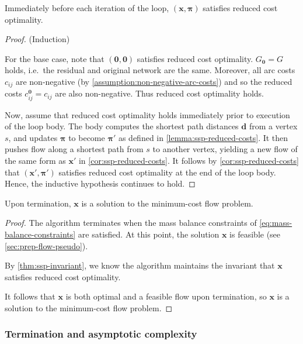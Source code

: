 \begin{thm} \label{thm:ssp-invariant}
Immediately before each iteration of the loop, $(\mathbf{x},\boldsymbol{\pi})$ satisfies reduced cost optimality.
\end{thm}
\begin{proof} (Induction)

For the base case, note that $(\mathbf{0},\mathbf{0})$ satisfies reduced cost optimality. $G_{\boldsymbol{0}} = G$ holds, i.e.\ the residual and original network are the same. Moreover, all arc costs $c_{ij}$ are non-negative (by \cref{assumption:non-negative-arc-costs}) and so the reduced costs $c^{\boldsymbol{0}}_{ij}=c_{ij}$ are also non-negative. Thus reduced cost optimality holds.

Now, assume that reduced cost optimality holds immediately prior to execution of the loop body. The body computes the shortest path distances $\mathbf{d}$ from a vertex $s$, and updates $\boldsymbol{\pi}$ to become $\boldsymbol{\pi'}$ as defined in \cref{lemma:ssp-reduced-costs}. It then pushes flow along a shortest path from $s$ to another vertex, yielding a new flow of the same form as $\mathbf{x'}$ in \cref{cor:ssp-reduced-costs}. It follows by \cref{cor:ssp-reduced-costs} that $(\mathbf{x}',\boldsymbol{\pi}')$ satisfies reduced cost optimality at the end of the loop body. Hence, the inductive hypothesis continues to hold.
\end{proof}

\begin{cor} \label{cor:ssp-correctness}
Upon termination, $\mathbf{x}$ is a solution to the minimum-cost flow problem.
\end{cor}
\begin{proof}
The algorithm terminates when the mass balance constraints of \cref{eq:mass-balance-constraints} are satisfied. At this point, the solution $\mathbf{x}$ is feasible (see \cref{sec:prep-flow-pseudo}). 

By \cref{thm:ssp-invariant}, we know the algorithm maintains the invariant that $\mathbf{x}$ satisfies reduced cost optimality. 

It follows that $\mathbf{x}$ is both optimal and a feasible flow upon termination, so $\mathbf{x}$ is a solution to the minimum-cost flow problem.
\end{proof}

\subsubsection{Termination and asymptotic complexity}

